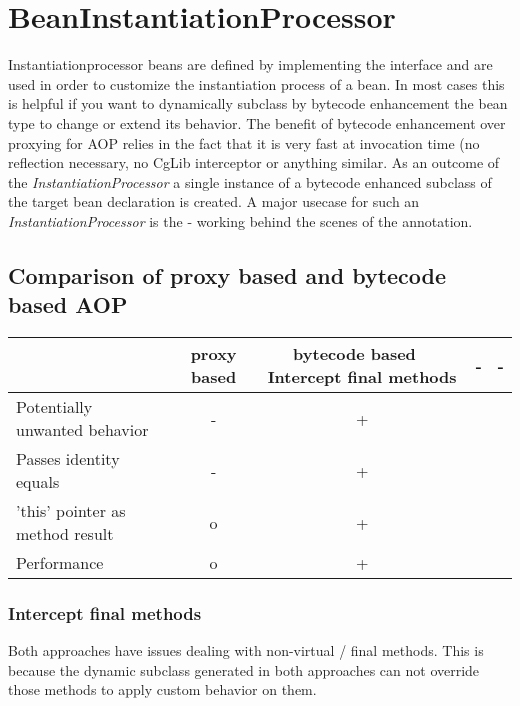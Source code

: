 \section{BeanInstantiationProcessor}
\label{feature:BeanInstantiationProcessor}
\ClearAPI
Instantiationprocessor beans are defined by implementing the interface  and are used in order to customize the instantiation process of a bean. In most cases this is helpful if you want to dynamically subclass by bytecode enhancement the bean type to change or extend its behavior.
\newline
The benefit of bytecode enhancement over proxying for AOP relies in the fact that it is very fast at invocation time (no reflection necessary, no CgLib interceptor or anything similar. As an outcome of the \textit{InstantiationProcessor} a single instance of a bytecode enhanced subclass of the target bean declaration is created.
\newline
A major usecase for such an \textit{InstantiationProcessor} is the  - working behind the scenes of the  annotation.


\subsection{Comparison of proxy based and bytecode based AOP}
\begin{longtable}{ l c c } \hline & \textbf{proxy based} & \textbf{bytecode based} \
	\endhead
	\hline
	Intercept final methods &
		- & -  \\
	\hline
	Potentially unwanted behavior &
		 - & + \\
	\hline
	Passes identity equals &
		 - & + \\
	\hline
	'this' pointer as method result &
		 o & + \\
	\hline
	Performance &
		o & + \\
	\hline
\end{longtable}

\subsubsection{Intercept final methods}
Both approaches have issues dealing with non-virtual / final methods. This is because the dynamic subclass generated in both approaches can not override those methods to apply custom behavior on them.

